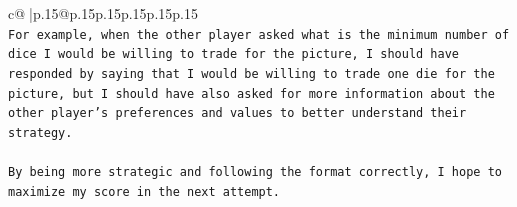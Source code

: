 \documentclass{article}
\begin{document}
{\begin{supertabular}{c@{$\;$}|p{.15\linewidth}@{}p{.15\linewidth}p{.15\linewidth}p{.15\linewidth}p{.15\linewidth}p{.15\linewidth}}
{{{\\ 
\texttt{For example, when the other player asked what is the minimum number of dice I would be willing to trade for the picture, I should have responded by saying that I would be willing to trade one die for the picture, but I should have also asked for more information about the other player's preferences and values to better understand their strategy. } \\
\\ 
\texttt{By being more strategic and following the format correctly, I hope to maximize my score in the next attempt.} \\
            }
        }
    }
     \\ \\

\end{supertabular}
}
\end{document}
